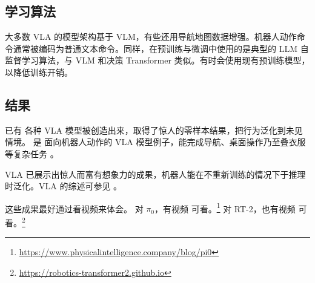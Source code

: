 \subsection{学习算法}
大多数 VLA 的模型架构基于 VLM，有些还用导航地图数据增强。机器人动作命令通常被编码为普通文本命令。同样，在预训练与微调中使用的是典型的 LLM 自监督学习算法，与 VLM 和决策 Transformer 类似。有时会使用现有预训练模型，以降低训练开销。


\subsection{结果}
已有
各种 VLA 模型被创造出来，取得了惊人的零样本结果，把行为泛化到未见情境。
\citet{chiang2024mobility,brohan2023rt,yang2025magma} 是
面向机器人动作的 VLA 模型例子，能完成导航、桌面操作乃至叠衣服等复杂任务 \citep{black2024pi_0}。


VLA 已展示出惊人而富有想象力的成果，机器人能在不重新训练的情况下于推理时泛化。VLA 的综述可参见
\citep{ma2024survey}。

这些成果最好通过看视频来体会。
对 $\pi_0$，有视频
可看。\footnote{\url{https://www.physicalintelligence.company/blog/pi0}} 
对 RT-2，也有视频
可看。\footnote{\url{https://robotics-transformer2.github.io}} 





